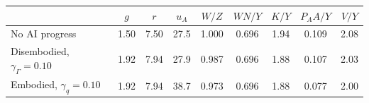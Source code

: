 \begin{tabular}{lcccccccc}\toprule
 & $g$ & $r$ & $u_A$ & $W/Z$ & $WN/Y$ & $K/Y$ & $P_AA/Y$ & $V/Y$\\\midrule
No AI progress & 1.50 & 7.50 & 27.5 & 1.000 & 0.696 & 1.94 & 0.109 & 2.08\\
Disembodied, $\gamma_\Gamma=0.10$ & 1.92 & 7.94 & 27.9 & 0.987 & 0.696 & 1.88 & 0.107 & 2.03\\
Embodied, $\gamma_q=0.10$ & 1.92 & 7.94 & 38.7 & 0.973 & 0.696 & 1.88 & 0.077 & 2.00\\
\bottomrule\end{tabular}
